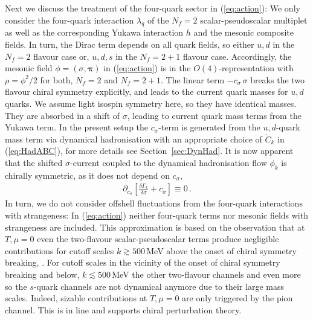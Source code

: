 \documentclass[%
reprint,
superscriptaddress,
showpacs,preprintnumbers,
 amsmath,amssymb,
 aps,
prd,
]{revtex4-1}
\def\eq#1{(\ref{#1})}
\def\sec#1{Section~\ref{#1}}
\begin{document}
Next we discuss the treatment of the four-quark sector in
\eq{eq:action}: We only consider the four-quark interaction
$\lambda_q$ of the $N_f = 2$ scalar-pseudoscalar multiplet as well as
the corresponding Yukawa interaction $h$ and the mesonic composite
fields. In turn, the Dirac term depends on all quark fields, so either
$u,d$ in the $N_f=2$ flavour case or, $u,d,s$ in the $N_f=2+1$ flavour
case. Accordingly, the mesonic field $\phi=(\sigma,\bm{\pi})$ in
\eq{eq:action} is in the $O(4)$-representation with $\rho=\phi^2/2$
for both, $N_f=2$ and $N_f=2+1$.  The linear term $-c_\sigma\,\sigma$
breaks the two flavour chiral symmetry explicitly, and leads to the
current quark masses for $u,d$ quarks. We assume light isospin
symmetry here, so they have identical masses. They are absorbed in a
shift of $\sigma$, leading to current quark mass terms from the Yukawa
term.  In the present setup the $c_\sigma$-term is generated from the
$u,d$-quark mass term via dynamical hadronisation with an appropriate
choice of $\dot{C}_k$ in \eq{eq:HadABC}, for more details see
\sec{sec:DynHad}. It is now apparent that the shifted
$\sigma$-current coupled to the dynamical hadronisation flow
$\dot{\phi}_k$ is chirally symmetric, as it does not depend on
$c_\sigma$,
%
\begin{align}\label{eq:GammaSigmaSym}
  \partial_{c_\sigma}\left[ \frac{\delta \Gamma_k}{
  \delta \sigma }+ c_\sigma\right]\equiv 0\,.
\end{align}
%
In turn, we do not consider offshell fluctuations from the four-quark
interactions with strangeness: In \eq{eq:action} neither four-quark
terms nor mesonic fields with strangeness are included.  This
approximation is based on the observation that at $T,\mu=0$ even the
two-flavour scalar-pseudoscalar terms produce negligible contributions
for cutoff scales $k\gtrsim 500\,$MeV above the onset of chiral
symmetry breaking, \cite{Mitter:2014wpa, Cyrol:2017qkl}. For cutoff
scales in the vicinity of the onset of chiral symmetry breaking and
below, $k\lesssim 500\,$MeV the other two-flavour channels and even
more so the $s$-quark channels are not dynamical anymore due to their
large mass scales. Indeed, sizable contributions at $T,\mu=0$ are only
triggered by the pion channel. This is in line and supports chiral
perturbation theory.
\end{document}
